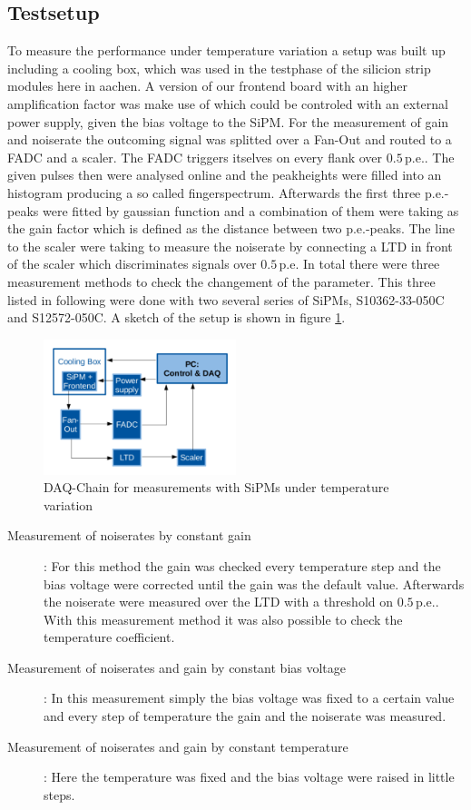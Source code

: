 \subsection{Testsetup}
To measure the performance under temperature variation a setup was built up including a cooling box, which was used in the testphase of the silicion strip modules here in aachen.
A version of our frontend board with an higher amplification factor was make use of which could be controled with an external power supply, given the bias voltage to the SiPM. For the measurement of gain and noiserate the outcoming signal was splitted over a Fan-Out and routed to a FADC and a scaler.
The FADC triggers itselves on every flank over $0.5\,\mathrm{p.e.}$. The given pulses then were analysed online and the peakheights were filled into an histogram producing a so called fingerspectrum.
Afterwards the first three p.e.-peaks were fitted by gaussian function and a combination of them were taking as the gain factor which is defined as the distance between two p.e.-peaks.
The line to the scaler were taking to measure the noiserate by connecting a LTD in front of the scaler which discriminates signals over $0.5\,\mathrm{p.e}$.
In total there were three measurement methods to check the changement of the parameter. This three listed in following were done with two several series of SiPMs, S10362-33-050C and S12572-050C.
A sketch of the setup is shown in figure \ref{NoRa_DAQ}. 
\begin{figure}[h]
	\centering
	\includegraphics[width = 0.5\textwidth]{Figures/radermacher/NoRa_DAQ_en.pdf}
	\caption{DAQ-Chain for measurements with SiPMs under temperature variation}
	\label{NoRa_DAQ}
\end{figure}
\begin{description}
	\item[Measurement of noiserates by constant gain]: For this method the gain was checked every temperature step and the bias voltage were corrected until the gain was the default value. Afterwards the noiserate were measured over the LTD with a threshold on $0.5\,\mathrm{p.e.}$. With this measurement method it was also possible to check the temperature coefficient.
	\item[Measurement of noiserates and gain by constant bias voltage]: In this measurement simply the bias voltage was fixed to a certain value and every step of temperature the gain and the noiserate was measured.
	\item[Measurement of noiserates and gain by constant temperature]: Here the temperature was fixed and the bias voltage were raised in little steps. 
\end{description}

